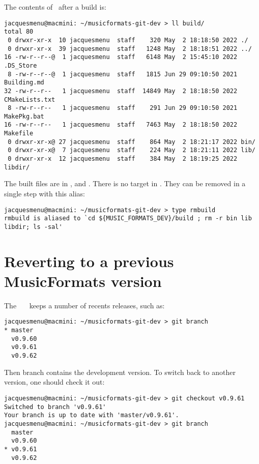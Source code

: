 The contents of \distrib\ after a build is:
\begin{lstlisting}[language=Terminal]
jacquesmenu@macmini: ~/musicformats-git-dev > ll build/
total 80
 0 drwxr-xr-x  10 jacquesmenu  staff    320 May  2 18:18:50 2022 ./
 0 drwxr-xr-x  39 jacquesmenu  staff   1248 May  2 18:18:51 2022 ../
16 -rw-r--r--@  1 jacquesmenu  staff   6148 May  2 15:45:10 2022 .DS_Store
 8 -rw-r--r--@  1 jacquesmenu  staff   1815 Jun 29 09:10:50 2021 Building.md
32 -rw-r--r--   1 jacquesmenu  staff  14849 May  2 18:18:50 2022 CMakeLists.txt
 8 -rw-r--r--   1 jacquesmenu  staff    291 Jun 29 09:10:50 2021 MakePkg.bat
16 -rw-r--r--   1 jacquesmenu  staff   7463 May  2 18:18:50 2022 Makefile
 0 drwxr-xr-x@ 27 jacquesmenu  staff    864 May  2 18:21:17 2022 bin/
 0 drwxr-xr-x@  7 jacquesmenu  staff    224 May  2 18:21:11 2022 lib/
 0 drwxr-xr-x  12 jacquesmenu  staff    384 May  2 18:19:25 2022 libdir/
\end{lstlisting}

The built files are in ,  and . There is no  target in \Makefile. They can be removed in a single step with this alias:
\begin{lstlisting}[language=Terminal]
jacquesmenu@macmini: ~/musicformats-git-dev > type rmbuild
rmbuild is aliased to `cd ${MUSIC_FORMATS_DEV}/build ; rm -r bin lib libdir; ls -sal'
\end{lstlisting}


\section{Reverting to a previous MusicFormats version}

The \github\ \mf\ \repo\ keeps a number of recents releases, such as:
\begin{lstlisting}[language=Terminal]
jacquesmenu@macmini: ~/musicformats-git-dev > git branch
* master
  v0.9.60
  v0.9.61
  v0.9.62
\end{lstlisting}

Then  branch contains the development version. To switch back to another version, one should check it out:
\begin{lstlisting}[language=Terminal]
jacquesmenu@macmini: ~/musicformats-git-dev > git checkout v0.9.61
Switched to branch 'v0.9.61'
Your branch is up to date with 'master/v0.9.61'.
jacquesmenu@macmini: ~/musicformats-git-dev > git branch
  master
  v0.9.60
* v0.9.61
  v0.9.62
\end{lstlisting}

